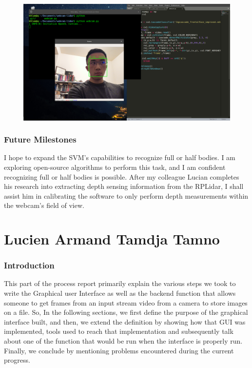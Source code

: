 \documentclass[onecolumn, draftclsnofoot,10pt, compsoc]{IEEEtran}
\begin{document}
\begin{singlespace}
			\begin{figure}[here]
				\includegraphics[scale=0.4, width=\textwidth]{lam_SVM_progess.png}
				\label{svm}
			\end{figure}

		\subsubsection{Future Milestones}
			I hope to expand the SVM's capabilities to recognize full or half bodies.
			I am exploring open-source algorithms to perform this task, and I am confident recognizing full or half bodies is possible.
			After my colleague Lucian completes his research into extracting depth sensing information from the RPLidar, I shall assist him in calibrating the software to only perform depth measurements within the webcam's field of view.


	\section{Lucien Armand Tamdja Tamno}
	
		\subsubsection{Introduction}
			This part of the process report primarily explain the various steps we took  to write the Graphical user Interface as well as the backend function that allows someone to get frames from an input stream video from a camera to store  images on a file. So,  In the following sections, we first define the purpose of the graphical interface built, and then, we extend the definition by showing how that GUI  was implemented, tools used to reach that implementation  and subsequently talk about one of the function that would be run when the interface is properly run. Finally, we conclude by mentioning problems encountered during the current progress. 
		

\end{singlespace}
\end{document}
